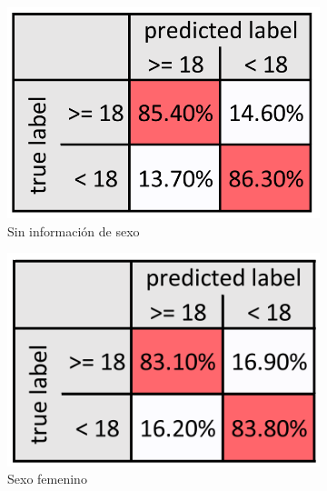 \begin{itemize}
\begin{figure}[h]
        \begin{subfigure}[b]{0.3\textwidth}
            \centering
            \includegraphics[width=\textwidth]{capitulos/cap_02/imagenes/confusion_matrix_binary_1.png}
            \caption{Sin información de sexo}
            \label{fig:conf_matrix_general}
        \end{subfigure}
        \hfill
        \begin{subfigure}[b]{0.3\textwidth}
            \centering
            \includegraphics[width=\textwidth]{capitulos/cap_02/imagenes/confusion_matrix_binary_2.png}
            \caption{Sexo femenino}
            \label{fig:conf_matrix_female}
        \end{subfigure}
        \hfill
        \begin{subfigure}[b]{0.3\textwidth}
            \centering

\end{subfigure}
\end{figure}
\end{itemize}
